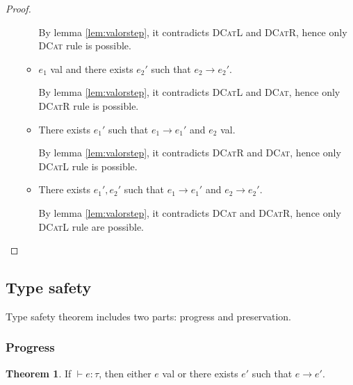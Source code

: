 \documentclass{article}
\theoremstyle{definition}
\newtheorem{theorem}{Theorem}[section]
\begin{document}
\begin{proof}
\begin{itemize}
\begin{itemize}
                        By lemma \ref{lem:valorstep}, it contradicts \textsc{DCatL} and \textsc{DCatR}, hence only \textsc{DCat} rule is possible.
                  \item $e_1$ \textsf{val} and there exists $e_2'$ such that $e_2\longrightarrow e_2'$.

                        By lemma \ref{lem:valorstep}, it contradicts \textsc{DCatL} and \textsc{DCat}, hence only \textsc{DCatR} rule is possible.
                  \item There exists $e_1'$ such that $e_1\longrightarrow e_1'$ and $e_2$ \textsf{val}.

                        By lemma \ref{lem:valorstep}, it contradicts \textsc{DCatR} and \textsc{DCat}, hence only \textsc{DCatL} rule is possible.
                  \item There exists $e_1',e_2'$ such that $e_1\longrightarrow e_1'$ and $e_2\longrightarrow e_2'$.

                        By lemma \ref{lem:valorstep}, it contradicts \textsc{DCat} and \textsc{DCatR}, hence only \textsc{DCatL} rule are possible.
              \end{itemize}
    \end{itemize}
    \color{black}
\end{proof}

\subsection{Type safety}

Type safety theorem includes two parts: progress and preservation.

\subsubsection*{Progress}

\begin{theorem}
    If $\vdash e:\tau$, then either $e$ \textsf{val} or there exists $e'$ such that $e\longrightarrow e'$.
\end{theorem}
\end{document}
